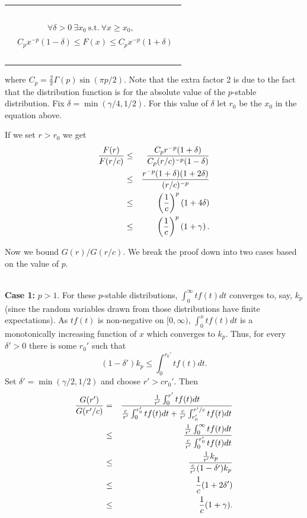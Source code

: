\documentclass[12pt]{article}
\begin{document}
\begin{tabular}{c}
\hfill~\\
$\forall\delta>0\ \exists x_0\mathrm{\ s.t.\ }\forall x\geq x_0,$\hfill~\\
~~$C_px^{-p}(1-\delta)\leq F(x)\leq C_px^{-p}(1+\delta)$\hfill~\\
\hfill~\\
\end{tabular}

\noindent
where $C_p=\frac{2}{\pi}\Gamma(p)\sin(\pi p/2)$. Note that the extra factor 2 is due to the fact that
the distribution function is for the absolute value of the $p$-stable
distribution. Fix $\delta =
\min(\gamma/4,1/2)$. For this value of $\delta$ let $r_0$ be the $x_0$ in the
equation above.


If we set $r>r_0$ we get
\begin{eqnarray*}
\frac{F(r)}{F(r/c)} &\leq&
\frac{C_pr^{-p}(1+\delta)}{C_p(r/c)^{-p}(1-\delta)} \cr&\leq&
\frac{r^{-p}(1+\delta)(1+2\delta)}{(r/c)^{-p}} \cr&\leq&
\left(\frac{1}{c}\right)^p\left(1+4\delta\right) \cr&\leq&
\left(\frac{1}{c}\right)^p\left(1+\gamma\right).
\end{eqnarray*}

Now we bound $G(r)/G(r/c)$.  We break the proof down into two
cases based on the value of $p$.  

\ \\{\bf Case 1:} $p>1$.  For these
$p$-stable distributions, $\int_0^{\infty}tf(t)dt$ converges to,
say, $k_p$ (since the random variables drawn from those distributions have finite expectations).  As $tf(t)$ is non-negative on $[0,\infty)$,
$\int_0^xtf(t)dt$ is a monotonically increasing function of $x$
which converges to $k_p$. Thus, for every $\delta' > 0$ there is some $r_0'$
such that
$$(1-\delta')k_p\leq\int_0^{r_0'}tf(t)dt.$$
Set $\delta'=\min(\gamma/2,1/2)$ and choose $r'>cr_0'$.
Then
\begin{eqnarray}
\frac{G(r')}{G(r'/c)} &=& \frac{\frac{1}{r'}\int_0^{r'}tf(t)dt}
     {\frac{c}{r'}\int_0^{r_0'}tf(t)dt+\frac{c}{r'}\int_{r_0'}^{r'/c}tf(t)dt}
\cr&\leq& \frac{\frac{1}{r'}\int_0^\infty tf(t)dt}
     {\frac{c}{r'}\int_0^{r_0'}tf(t)dt}
\cr&\leq& \frac{\frac{1}{r'}k_p}
     {\frac{c}{r'}(1-\delta')k_p}
\cr&\leq& \frac{1}{c}(1+2\delta') \cr&\leq&
\frac{1}{c}(1+\gamma).
\end{eqnarray}
\end{document}
